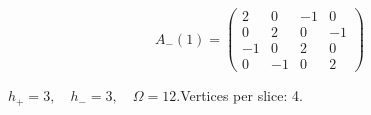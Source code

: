 \begin{minipage}{\linewidth}
\begin{minipage}[c]{0.495\linewidth}
\end{minipage}%
\begin{minipage}[c]{0.495\linewidth}\centering\fontsize{9.7}{12}\selectfont
\setlength{\abovedisplayskip}{4pt}\setlength{\belowdisplayskip}{4pt}
\setlength{\abovedisplayshortskip}{4pt}\setlength{\belowdisplayshortskip}{4pt}
\setlength{\arraycolsep}{3pt}\renewcommand{\arraystretch}{1.08}
\[A_{-}(1)=\begin{pmatrix}2 & 0 & -1 & 0\\0 & 2 & 0 & -1\\-1 & 0 & 2 & 0\\0 & -1 & 0 & 2\end{pmatrix}\]
\end{minipage}%
\par\smallskip\noindent\small $h_+=3,\quad h_-=3,\quad \Omega=12.$\quad Vertices per slice: 4.
\end{minipage}\par\vfill

